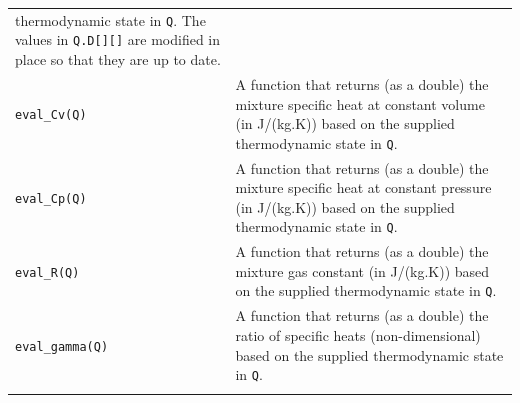 \begin{tabular}{p{6.2cm}p{10cm}}
thermodynamic state in \texttt{Q}. The values in \texttt{Q.D[][]} are modified
in place so that they are up to date. \\
\texttt{eval\_Cv(Q)} & A function that returns (as a double)
the mixture specific heat at constant volume (in J/(kg.K)) based
on the supplied thermodynamic state in \texttt{Q}. \\
\texttt{eval\_Cp(Q)} & A function that returns (as a double)
the mixture specific heat at constant pressure (in J/(kg.K)) based
on the supplied thermodynamic state in \texttt{Q}. \\
\texttt{eval\_R(Q)} & A function that returns (as a double)
the mixture gas constant (in J/(kg.K)) based
on the supplied thermodynamic state in \texttt{Q}. \\
\texttt{eval\_gamma(Q)} & A function that returns (as a double)
the ratio of specific heats (non-dimensional) based
on the supplied thermodynamic state in \texttt{Q}. \\
\noalign{\smallskip} \hline \noalign{\smallskip}
\end{tabular}
\\
